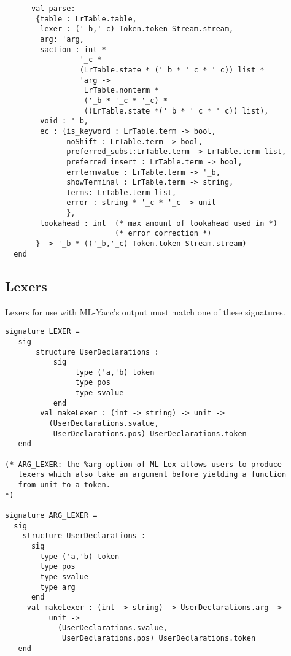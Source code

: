 \documentclass{article}
\begin{document}
\begin{tt}
\begin{verbatim}
      val parse:
       {table : LrTable.table,
        lexer : ('_b,'_c) Token.token Stream.stream,
        arg: 'arg,
        saction : int *
                 '_c *
                 (LrTable.state * ('_b * '_c * '_c)) list * 
                 'arg ->
                  LrTable.nonterm *
                  ('_b * '_c * '_c) *
                  ((LrTable.state *('_b * '_c * '_c)) list),
        void : '_b,
        ec : {is_keyword : LrTable.term -> bool,
              noShift : LrTable.term -> bool,
              preferred_subst:LrTable.term -> LrTable.term list,
              preferred_insert : LrTable.term -> bool,
              errtermvalue : LrTable.term -> '_b,
              showTerminal : LrTable.term -> string,
              terms: LrTable.term list,
              error : string * '_c * '_c -> unit
              },
        lookahead : int  (* max amount of lookahead used in *)
                         (* error correction *)
       } -> '_b * (('_b,'_c) Token.token Stream.stream)
  end
\end{verbatim}
\end{tt}

\subsection{Lexers}

Lexers for use with ML-Yacc's output must match one of these signatures.

\begin{tt}
\begin{verbatim}
signature LEXER =
   sig
       structure UserDeclarations :
           sig
                type ('a,'b) token
                type pos
                type svalue
           end
        val makeLexer : (int -> string) -> unit -> 
          (UserDeclarations.svalue,
           UserDeclarations.pos) UserDeclarations.token
   end

(* ARG_LEXER: the %arg option of ML-Lex allows users to produce
   lexers which also take an argument before yielding a function
   from unit to a token.
*)

signature ARG_LEXER =
  sig
    structure UserDeclarations :
      sig
        type ('a,'b) token
        type pos
        type svalue
        type arg
      end
     val makeLexer : (int -> string) -> UserDeclarations.arg ->
          unit -> 
            (UserDeclarations.svalue,
             UserDeclarations.pos) UserDeclarations.token
   end
\end{verbatim}
\end{tt}
\end{document}
